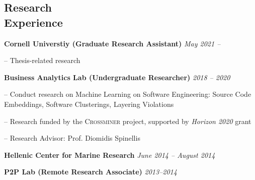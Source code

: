 \documentclass[margin, 10pt]{res}
\begin{document}
\begin{resume}
\section{Research \\ Experience}

\textbf{Cornell Universtiy (Graduate Research Assistant)} \hfill \emph{May 2021 --}
\begin{compactitem}
	\item[--] Thesis-related research
\end{compactitem}

\textbf{Business Analytics Lab (Undergraduate Researcher)} \hfill \emph{2018 -- 2020}
\begin{compactitem}
\item[--] Conduct research on Machine Learning on Software Engineering: Source Code Embeddings, Software Clusterings, Layering Violations
\item[--] Research funded by the \textsc{Crossminer} project, supported by \emph{Horizon 2020} grant
\item[--] Research Advisor: Prof. Diomidis Spinellis
\end{compactitem}

\textbf{Hellenic Center for Marine Research} \hfill \emph{June 2014 -- August 2014}



\textbf{P2P Lab (Remote Research Associate)} \hfill \emph{2013--2014}



\end{resume}
\end{document}
